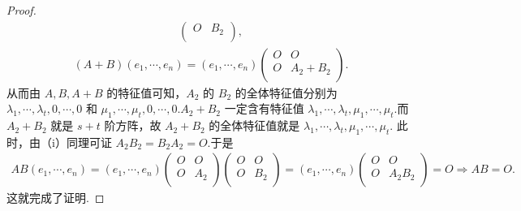 \documentclass[../../main.tex]{subfiles}
\begin{document}
\begin{proof}
\begin{align*}
\begin{pmatrix}
O&		B_2\\
\end{pmatrix},
\end{align*}
\begin{align*}
\left( A+B \right) \left( e_1,\cdots ,e_n \right) =\left( e_1,\cdots ,e_n \right) \begin{pmatrix}
O&		O\\
O&		A_2+B_2\\
\end{pmatrix}.
\end{align*}
从而由 $A,B,A+B$ 的特征值可知，$A_2$ 的 $B_2$ 的全体特征值分别为 $\lambda _1,\cdots ,\lambda _t,0,\cdots ,0$ 和 $\mu _1,\cdots ,\mu _t,0,\cdots ,0$.$A_2+B_2$ 一定含有特征值 $\lambda _1,\cdots ,\lambda _t,\mu _1,\cdots ,\mu _t$.而 $A_2+B_2$ 就是 $s+t$ 阶方阵，故 $A_2+B_2$ 的全体特征值就是 $\lambda _1,\cdots ,\lambda _t,\mu _1,\cdots ,\mu _t$.
此时，由（i）同理可证 $A_2B_2=B_2A_2=O$.于是
\begin{align*}
AB\left( e_1,\cdots ,e_n \right) =\left( e_1,\cdots ,e_n \right) \begin{pmatrix}
O&		O\\
O&		A_2\\
\end{pmatrix} \begin{pmatrix}
O&		O\\
O&		B_2\\
\end{pmatrix} =\left( e_1,\cdots ,e_n \right) \begin{pmatrix}
O&		O\\
O&		A_2B_2\\
\end{pmatrix} =O\Rightarrow AB=O.
\end{align*}
这就完成了证明.
\end{proof}
\end{document}
